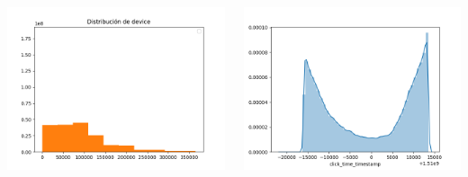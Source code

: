 \documentclass{beamer}
\theoremstyle{plain}
\theoremstyle{definition}
\theoremstyle{plain}
\theoremstyle{definition}
\theoremstyle{remark}
\theoremstyle{definition}
\begin{document}
\begin{frame}


	\begin{columns}[t]
		\centering
	\includegraphics[scale=0.4]{../img/device_distribution.png}\\

	
		\centering

				\includegraphics[scale=0.4]{../img/normalDistclick_time_timestamp.png}
	\end{columns}
\end{frame}
\end{document}

